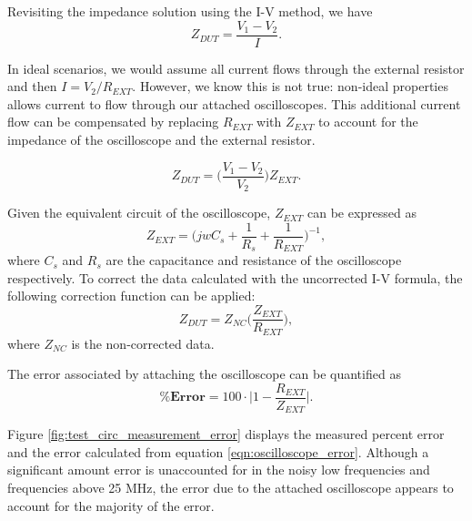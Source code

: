 \par Revisiting the impedance solution using the I-V method, we have
\begin{equation}
    Z_{DUT} = \frac{V_1 - V_2}{I}.
\end{equation}

\noindent In ideal scenarios, we would assume all current flows through the external resistor and then $I = V_2 / R_{EXT}$. However, we know this is not true: non-ideal properties allows current to flow through our attached oscilloscopes. This additional current flow can be compensated by replacing $R_{EXT}$ with $Z_{EXT}$ to account for the impedance of the oscilloscope and the external resistor. 

\begin{equation}
    Z_{DUT} = \bigg(\frac{V_1 - V_2}{V_2}\bigg)Z_{EXT}.
    \label{eqn:corrected_IV}
\end{equation}

\par Given the equivalent circuit of the oscilloscope, $Z_{EXT}$ can be expressed as
\begin{equation}
    Z_{EXT} = \bigg(jwC_{s}+\frac{1}{R_{s}}+\frac{1}{R_{EXT}}\bigg)^{-1},
    \label{eqn:corrected_Rext}
\end{equation}
\noindent where $C_{s}$ and $R_{s}$ are the capacitance and resistance of the oscilloscope respectively. To correct the data calculated with the uncorrected I-V formula, the following correction function can be applied:
\begin{equation}
    Z_{DUT} = Z_{NC}\bigg(\frac{Z_{EXT}}{R_{EXT}}\bigg),
    \label{eqn:IV_correction_function}
\end{equation}
\noindent where $Z_{NC}$ is the non-corrected data. 

\par The error associated by attaching the oscilloscope can be quantified as
\begin{equation}
    \pmb{\%} \textbf{Error} = 100 \cdot \bigg| 1 - \frac{R_{EXT}}{Z_{EXT}}\bigg|.
    \label{eqn:oscilloscope_error}
\end{equation}

\par Figure \ref{fig:test_circ_measurement_error} displays the measured percent error and the error calculated from equation \ref{eqn:oscilloscope_error}. Although a significant amount error is unaccounted for in the noisy low frequencies and frequencies above 25 MHz, the error due to the attached oscilloscope appears to account for the majority of the error.

